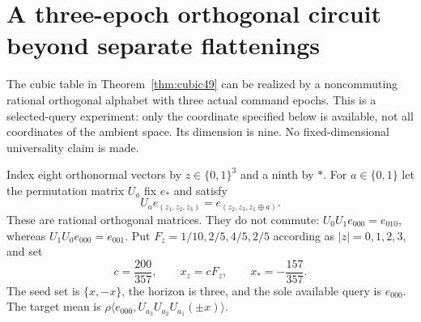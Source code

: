 \section{A three-epoch orthogonal circuit beyond separate flattenings}
\label{sec:orthogonal50}
The cubic table in Theorem~\ref{thm:cubic49} can be realized by a
noncommuting rational orthogonal alphabet with three actual command
epochs. This is a selected-query experiment: only the coordinate
specified below is available, not all coordinates of the ambient space.
Its dimension is nine. No fixed-dimensional universality claim is made.

Index eight orthonormal vectors by $z\in\{0,1\}^3$ and a ninth by $*$.
For $a\in\{0,1\}$ let the permutation matrix $U_a$ fix $e_*$ and satisfy
\begin{equation}\label{eq:permutation50}
 U_ae_{(z_1,z_2,z_3)}=e_{(z_2,z_3,z_1\mathbin\oplus a)}.
\end{equation}
These are rational orthogonal matrices. They do not commute:
$U_0U_1e_{000}=e_{010}$, whereas $U_1U_0e_{000}=e_{001}$.
Put $F_z=1/10,2/5,4/5,2/5$ according as $|z|=0,1,2,3$, and set
\begin{equation}\label{eq:seed50}
 c=\frac{200}{357},\qquad x_z=cF_z,\qquad x_*=-\frac{157}{357}.
\end{equation}
The seed set is $\{x,-x\}$, the horizon is three, and the sole available
query is $e_{000}$. The target mean is
$\rho\langle e_{000},U_{a_3}U_{a_2}U_{a_1}(\pm x)\rangle$.

